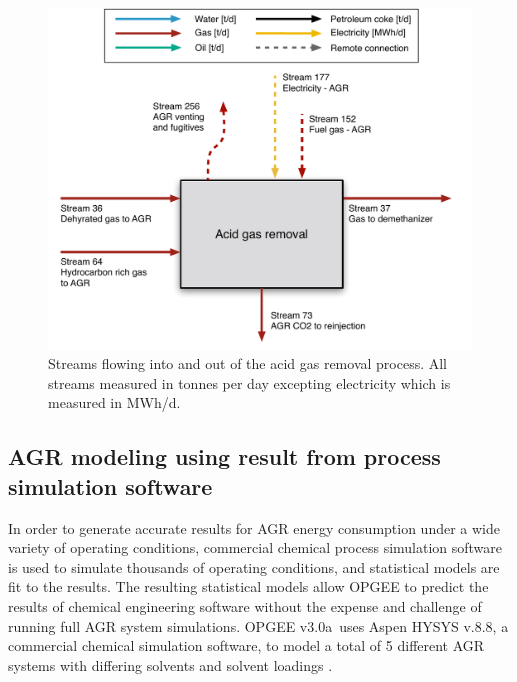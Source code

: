 \documentclass[11pt]{report}
\newcommand{\version}{v3.0a}
\begin{document}
\begin{figure}
\includegraphics[width=0.85\columnwidth]{images/acid_gas_removal_PF.pdf}
\caption{Streams flowing into and out of the acid gas removal process. All streams measured in tonnes per day excepting electricity which is measured in MWh/d.}
\label{fig:acid_gas_removal_PF}
\end{figure}


\subsection{AGR modeling using result from process simulation software} \label{AGRaspen}


In order to generate accurate results for AGR energy consumption under a wide variety of operating conditions, commercial chemical process simulation software is used to simulate thousands of operating conditions, and statistical models are fit to the results. The resulting statistical models allow OPGEE to predict the results of chemical engineering software without the expense and challenge of running full AGR system simulations. OPGEE \version \, uses Aspen HYSYS v.8.8, a commercial chemical simulation software, to model a total of 5 different AGR systems with differing solvents and solvent loadings \cite{Aspentech2016}. 
\end{document}

